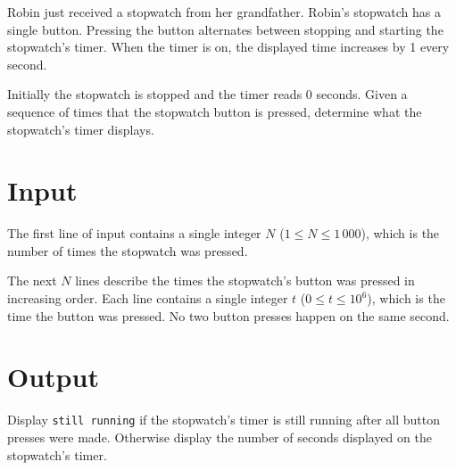 
Robin just received a stopwatch from her grandfather. Robin's stopwatch has a single button. Pressing the button alternates between stopping and starting the stopwatch's timer. When the timer is on, the displayed time increases by 1 every second.

Initially the stopwatch is stopped and the timer reads 0 seconds. Given a sequence of times that the stopwatch button is pressed, determine what the stopwatch's timer displays.

\section*{Input}
The first line of input contains a single integer $N$ ($1 \leq N \leq 1\,000$), which is the number of times the stopwatch was pressed.

The next $N$ lines describe the times the stopwatch's button was pressed in increasing order. Each line contains a single integer $t$ ($0 \leq t \leq 10^6$), which is the time the button was pressed. No two button presses happen on the same second.

\section*{Output}
Display \texttt{still running} if the stopwatch's timer is still running after all button presses were made. Otherwise display the number of seconds displayed on the stopwatch's timer.
